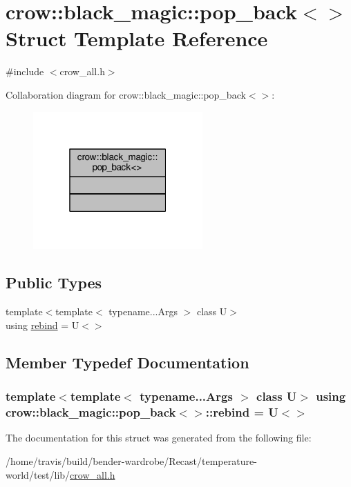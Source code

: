 \hypertarget{structcrow_1_1black__magic_1_1pop__back_3_4}{\section{crow\-:\-:black\-\_\-magic\-:\-:pop\-\_\-back$<$$>$ Struct Template Reference}
\label{structcrow_1_1black__magic_1_1pop__back_3_4}
}


{\ttfamily \#include $<$crow\-\_\-all.\-h$>$}



Collaboration diagram for crow\-:\-:black\-\_\-magic\-:\-:pop\-\_\-back$<$$>$\-:
\nopagebreak
\begin{figure}[H]
\begin{center}
\leavevmode
\includegraphics[width=184pt]{structcrow_1_1black__magic_1_1pop__back_3_4__coll__graph}
\end{center}
\end{figure}
\subsection*{Public Types}
\begin{DoxyCompactItemize}
\item 
{\footnotesize template$<$template$<$ typename...\-Args $>$ class U$>$ }\\using \hyperlink{structcrow_1_1black__magic_1_1pop__back_3_4_aa88f068eef9fff777b0a20cc75a2e301}{rebind} = U$<$$>$
\end{DoxyCompactItemize}


\subsection{Member Typedef Documentation}
\hypertarget{structcrow_1_1black__magic_1_1pop__back_3_4_aa88f068eef9fff777b0a20cc75a2e301}{
\subsubsection[{rebind}]{\setlength{\rightskip}{0pt plus 5cm}template$<$template$<$ typename...\-Args $>$ class U$>$ using {\bf crow\-::black\-\_\-magic\-::pop\-\_\-back}$<$$>$\-::{\bf rebind} =  U$<$$>$}}\label{structcrow_1_1black__magic_1_1pop__back_3_4_aa88f068eef9fff777b0a20cc75a2e301}


The documentation for this struct was generated from the following file\-:\begin{DoxyCompactItemize}
\item 
/home/travis/build/bender-\/wardrobe/\-Recast/temperature-\/world/test/lib/\hyperlink{crow__all_8h}{crow\-\_\-all.\-h}\end{DoxyCompactItemize}
